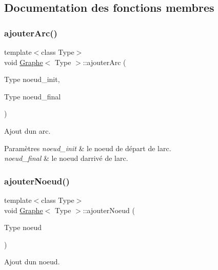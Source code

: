 \subsection{Documentation des fonctions membres}
\mbox{\label{classGraphe_a690a652df5be597b9045d2036bad11ed}} 
\subsubsection{\texorpdfstring{ajouter\+Arc()}{ajouterArc()}}
{\footnotesize\ttfamily template$<$class Type$>$ \\
void \hyperlink{classGraphe}{Graphe}$<$ Type $>$\+::ajouter\+Arc (\begin{DoxyParamCaption}\item[{Type}]{noeud\+\_\+init,  }\item[{Type}]{noeud\+\_\+final }\end{DoxyParamCaption})}



Ajout d\textquotesingle{}un arc. 


\begin{DoxyParams}{Paramètres}
{\em noeud\+\_\+init} & le noeud de départ de l\textquotesingle{}arc. \\
\hline
{\em noeud\+\_\+final} & le noeud d\textquotesingle{}arrivé de l\textquotesingle{}arc. \\
\hline
\end{DoxyParams}
\mbox{\label{classGraphe_a555829daa877e49cdb4e9555e559650c}} 
\subsubsection{\texorpdfstring{ajouter\+Noeud()}{ajouterNoeud()}}
{\footnotesize\ttfamily template$<$class Type$>$ \\
void \hyperlink{classGraphe}{Graphe}$<$ Type $>$\+::ajouter\+Noeud (\begin{DoxyParamCaption}\item[{Type}]{noeud }\end{DoxyParamCaption})}



Ajout d\textquotesingle{}un noeud. 


